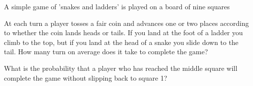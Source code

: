 \begin{problem}
A simple game of 'snakes and ladders' is played on a board of nine squares
\begin{figure}[thb]
\centering
{}
\end{figure}

At each turn a player tosses a fair coin and advances one or two places according to whether the coin lands heads or tails. If you land at the foot of a ladder you climb to the top, but if you land at the head of a snake you slide down to the tail. How many turn on average does it take to complete the game?

What is the probability that a player who has reached the middle square will complete the game without slipping back to square 1?
\end{problem}

